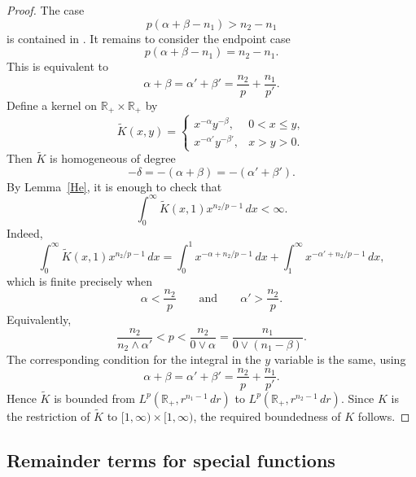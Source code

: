 \documentclass[12pt]{amsart}
\begin{document}
\begin{proof}
The case
\[
    p(\alpha+\beta-n_1)>n_2-n_1
\]
is contained in \cite[Lemma~2.6]{Nix}. It remains to consider the endpoint
case
\[
    p(\alpha+\beta-n_1)=n_2-n_1.
\]
This is equivalent to
\[
    \alpha+\beta=\alpha'+\beta'
    =
    \frac{n_2}{p}+\frac{n_1}{p'}.
\]
Define a kernel on $\mathbb{R}_+\times\mathbb{R}_+$ by
\[
\widetilde K(x,y)=
    \begin{cases}
       x^{-\alpha}y^{-\beta}, & 0<x\le y,\\
       x^{-\alpha'}y^{-\beta'}, & x>y>0.
    \end{cases}
\]
Then $\widetilde K$ is homogeneous of degree
\[
    -\delta=-(\alpha+\beta)=-(\alpha'+\beta').
\]
By Lemma~\ref{He}, it is enough to check that
\[
    \int_0^\infty \widetilde K(x,1)x^{n_2/p-1}\,dx<\infty .
\]
Indeed,
\[
    \int_0^\infty \widetilde K(x,1)x^{n_2/p-1}\,dx
    =
    \int_0^1 x^{-\alpha+n_2/p-1}\,dx
    +
    \int_1^\infty x^{-\alpha'+n_2/p-1}\,dx,
\]
which is finite precisely when
\[
    \alpha<\frac{n_2}{p}
    \qquad\text{and}\qquad
    \alpha'>\frac{n_2}{p}.
\]
Equivalently,
\[
    \frac{n_2}{n_2\wedge \alpha'}
    <
    p
    <
    \frac{n_2}{0\vee\alpha}
    =
    \frac{n_1}{0\vee(n_1-\beta)}.
\]
The corresponding condition for the integral in the $y$ variable is the
same, using
\[
    \alpha+\beta=\alpha'+\beta'
    =
    \frac{n_2}{p}+\frac{n_1}{p'}.
\]
Hence $\widetilde K$ is bounded from
$L^p(\mathbb{R}_+,r^{n_1-1}\,dr)$ to
$L^p(\mathbb{R}_+,r^{n_2-1}\,dr)$. Since $K$ is the restriction of
$\widetilde K$ to $[1,\infty)\times[1,\infty)$, the required boundedness
of $K$ follows.
\end{proof}


\subsection{Remainder terms for special functions}
\label{appendix}
\end{document}
